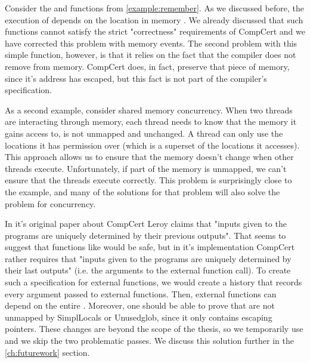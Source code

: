 Consider the  and  functions from \ref{example:remember}. As we discussed before, the execution of  depends on the location in memory . We already discussed that such functions cannot satisfy the strict "correctness" requirements of CompCert and we have corrected this problem with memory events. The second problem with this simple function, however, is that it relies on the fact that the compiler does not remove  from memory. CompCert does, in fact, preserve that piece of memory, since it's address has escaped, but this fact is not part of the compiler's specification. 

As a second example, consider shared memory concurrency. When two threads are interacting through memory, each thread needs to know that the memory it gains access to, is not unmapped and unchanged. A thread can only use the locations it has permission over (which is a superset of the locations it accesses). This approach allows us to ensure that the memory doesn't change when other threads execute. Unfortunately, if part of the memory is unmapped, we can't ensure that the threads execute correctly. This problem is surprisingly close to the   example, and many of the solutions for that problem will also solve the problem for concurrency. 

In it's original paper about CompCert Leroy \cite{Leroy-Compcert-CACM} claims that "inputs given to the programs are uniquely determined by their previous outputs". That seems to suggest that functions like  would be safe, but in it's implementation CompCert rather requires that "inputs given to the programs are uniquely determined by their last outputs" (i.e. the arguments to the external function call). To create such a specification for external functions, we would create a history  that records every argument passed to external functions. Then, external functions can depend on the entire . Moreover, one should be able to prove that  are not unmapped by SimplLocals or Unusedglob, since it only contains escaping pointers. These changes are beyond the scope of the thesis, so we temporarily use  and we skip the two problematic passes. We discuss this solution further in the \ref{ch:futurework} section.

